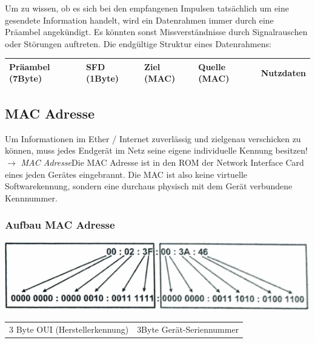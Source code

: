 \documentclass[12pt,a4paper]{article}
\begin{document}
Um zu wissen, ob es sich bei den empfangenen Impulsen tatsächlich um eine gesendete Information handelt, wird ein Datenrahmen immer durch eine Präambel angekündigt. Es könnten sonst Missverständnisse durch Signalrauschen oder Störungen auftreten. Die endgültige Struktur eines Datenrahmens:
	\begin{center}
		\begin{tabularx}{17cm}{|l|l|X|X|X|}
			\hline
			Präambel (7Byte)&SFD (1Byte)&Ziel (MAC)&Quelle (MAC)&Nutzdaten\\
			\hline
		\end{tabularx}
	\end{center}

\subsection{MAC Adresse}
Um Informationen im Ether / Internet zuverlässig und zielgenau verschicken zu können, muss jedes Endgerät im Netz seine eigene individuelle Kennung besitzen!\newline $\longrightarrow$ \emph{MAC Adresse}\newline Die MAC Adresse ist in den ROM der Network Interface Card eines jeden Gerätes eingebrannt. Die MAC ist also keine virtuelle Softwarekennung, sondern eine durchaus physisch mit dem Gerät verbundene Kennnummer.

\subsubsection{Aufbau MAC Adresse}
\begin{center}
\includegraphics[scale=1]{Bilder/MAC.png}
\begin{tabularx}{14cm}{XX}
3 Byte OUI (Herstellerkennung)&3Byte Gerät-Seriennummer
\end{tabularx}
\end{center}
\end{document}
